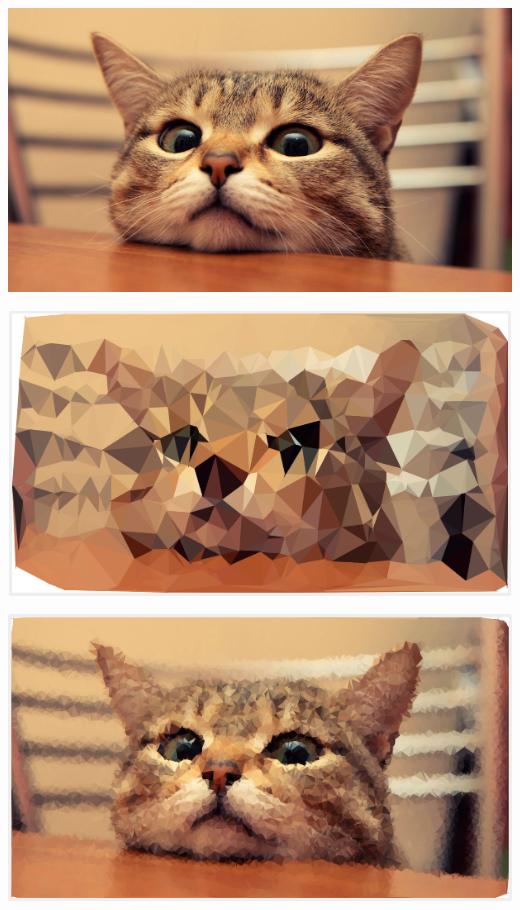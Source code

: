 \begin{minipage}[t]{0.3\textwidth}
    \includegraphics[width=\textwidth]{images/delaunay_example_01_orig.png}
\label{fig:delaunayExample01Orig}
\end{minipage}
\begin{minipage}[t]{0.3\textwidth}
    \includegraphics[width=\textwidth]{images/delaunay_example_01_500.png}
\label{fig:delaunayExample01500}
\end{minipage}
\begin{minipage}[t]{0.3\textwidth}
    \includegraphics[width=\textwidth]{images/delaunay_example_01_8000.png}
\label{fig:delaunayExample018000}
\end{minipage}
